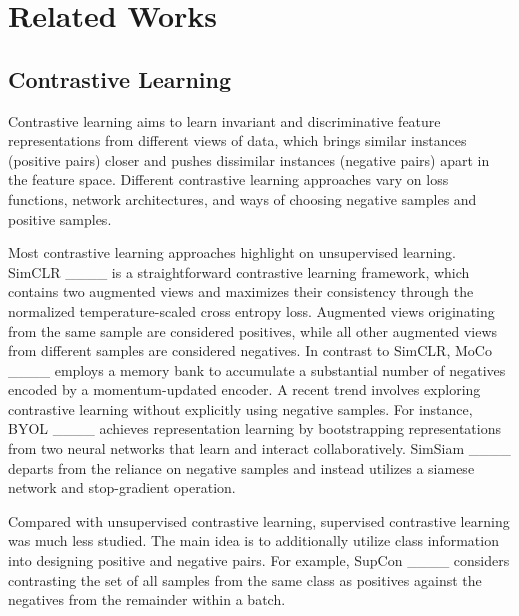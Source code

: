 \section{Related Works}
\label{sect:rw}
\subsection{Contrastive Learning}
Contrastive learning aims to learn invariant and discriminative feature representations from different views of data, which brings similar instances (positive pairs) closer and pushes dissimilar instances (negative pairs) apart in the feature space. Different contrastive learning approaches vary on loss functions, network architectures, and ways of choosing negative samples and positive samples. 

Most contrastive learning approaches highlight on unsupervised learning. SimCLR ____ is a straightforward contrastive learning framework, which contains two augmented views and maximizes their consistency through the normalized temperature-scaled cross entropy loss. Augmented views originating from the same sample are considered positives, while all other augmented views from different samples are considered negatives. In contrast to SimCLR, MoCo ____ employs a memory bank to accumulate a substantial number of negatives encoded by a momentum-updated encoder. A recent trend involves exploring contrastive learning without explicitly using negative samples. For instance, BYOL ____ achieves representation learning by bootstrapping representations from two neural networks that learn and interact collaboratively. SimSiam ____ departs from the reliance on negative samples and instead utilizes a siamese network and stop-gradient operation.

Compared with unsupervised contrastive learning, supervised contrastive learning was much less studied. The main idea is to additionally utilize class information into designing positive and negative pairs. For example, SupCon ____ considers contrasting the set of all samples from the same class as positives against the negatives from the remainder within a batch.

